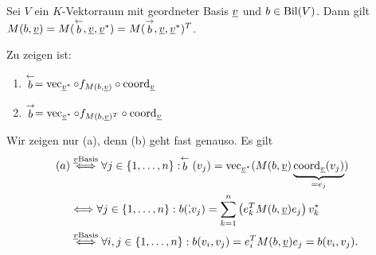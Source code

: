 \documentclass[../../main.tex]{subfiles}
\begin{document}
\begin{pro}\label{13.3.8}
Sei $V$ ein $K$-Vektorraum mit geordneter Basis ${\underline v}$ und $b\in \operatorname{Bil}(V)$. Dann gilt $M(b,{\underline v})=M(\stackrel{\leftarrow}{b}, {\underline v},{\underline v}^*)=M(\stackrel{\rightarrow}{b},{\underline v},{\underline v}^*)^T$.
\end{pro}
\begin{cproof} Zu zeigen ist:
\begin{enumerate}[\normalfont (a)]
\item $\stackrel{\leftarrow}{b}=\operatorname{vec}_{{\underline v}^*}\circ f_{M(b,{\underline v})}\circ \operatorname{coord}_{\underline v}$
\item $\stackrel{\rightarrow}{b}=\operatorname{vec}_{{\underline v}^*}\circ f_{M(b,{\underline v})^T}\circ \operatorname{coord}_{\underline v}$
\end{enumerate}
Wir zeigen nur (a), denn (b) geht fast genauso. Es gilt
\begin{align*}
(a)&\stackrel{{\underline v}\text{Basis}}{\Longleftrightarrow}\forall j\in\{1,\ldots ,n\}: \stackrel{\leftarrow}{b}(v_j)=\operatorname{vec}_{{\underline v}^*}(M(b,{\underline v})\underbrace{\operatorname{coord}_{\underline v}(v_j)}_{=e_j})\\
&\Longleftrightarrow \forall j\in\{1,\ldots ,n\}: b(\dot, v_j)=\sum_{k=1}^n\left(e_k^TM(b,{\underline v})e_j\right)v_k^*\\
&\stackrel{{\underline v}\text{Basis}}{\Longleftrightarrow}\forall i,j\in\{1,\ldots ,n\}: b(v_i,v_j)=e_i^TM(b,{\underline v})e_j=b(v_i,v_j).
\end{align*}
\end{cproof}
\end{document}
